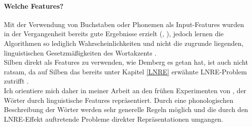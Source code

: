 \paragraph*{Welche Features?}
Mit der Verwendung von Buchstaben oder Phonemen als Input-Features wurden in der Vergangenheit bereits gute Ergebnisse erzielt (\cite{Hain2004}, \cite{Dou&Bergsma2009}), jedoch lernen die Algorithmen so lediglich Wahrscheinlichkeiten und nicht die zugrunde liegenden, linguistischen Gesetzmäßigkeiten des Wortakzents \cite[S.~80]{Demberg2006}.
\\
Silben direkt als Features zu verwenden, wie Demberg es getan hat, ist auch nicht ratsam, da auf Silben das bereits unter Kapitel \ref{LNRE} erwähnte LNRE-Problem zutrifft \cite[S.~69]{Demberg2006b}.
\\
Ich orientiere mich daher in meiner Arbeit an den frühen Experimenten von \cite{Rapp1995}, der Wörter durch linguistische Features repräsentiert. Durch eine phonologischen Beschreibung der Wörter werden sehr generelle Regeln möglich und die durch den LNRE-Effekt auftretende Probleme direkter Repräsentationen umgangen.


